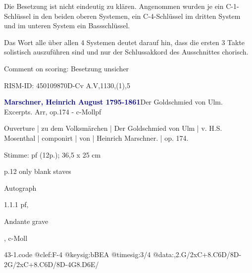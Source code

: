 \documentclass[a4paper, twocolumn, 11pt]{book}
\begin{document}
\newline %
\par Die Besetzung ist nicht eindeutig zu klären. Angenommen wurden je ein C-1-Schlüssel in den beiden oberen Systemen, ein C-4-Schlüssel im dritten System und im unteren System ein Bassschlüssel.
\par Das Wort {\textquotedbl}alle{\textquotedbl} über allen 4 Systemen deutet darauf hin, dass die ersten 3 Takte solistisch auszuführen sind und nur der Schlussakkord des Ausschnittes chorisch.
\par Comment on scoring: Besetzung unsicher
\par RISM-ID: 450109870\newline D-Cv  A.V,1130,(1),5
\par \vspace{16pt} \textcolor{darkblue}{\textbf{Marschner, Heinrich August  1795-1861}}\hfillplus{[43]}\newline Der Goldschmied von Ulm. Excerpts. Arr, op.174 - c-Moll\newline pf
\par \begin{itshape} Ouverture | zu dem Volksmärchen | Der Goldschmied von Ulm | v. H.S. Mosenthal | componirt | von | Heinrich Marschner. | op. 174.\end{itshape} 
\par \textcolor{darkblue}{}  Stimme: pf  (12p.); 36,5 x 25 cm\newline \begin{small} p.12 only blank staves\end{small} \newline Autograph
\par 1.1.1  pf, \begin{itshape}Andante grave\end{itshape}, c-Moll  
\begin{filecontents*}{43-1.code}
@clef:F-4
@keysig:bBEA
@timesig:3/4
@data:,2.G/2xC+{8.C6D}/8D-2G/2xC+{8.C6D}/8D-4G{8.D6E}/
\end{filecontents*}
\end{document}
